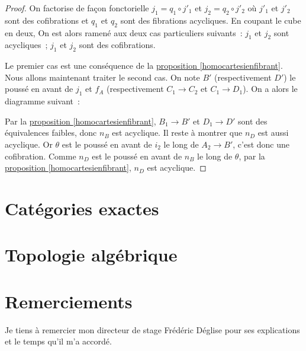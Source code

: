 \documentclass{amsart}
\newcommand{\sref}[2]{\hyperref[#2]{#1 \ref*{#2}}}
\theoremstyle{plain}
\theoremstyle{definition}
\theoremstyle{remark}
\newcommand{\ra}{\rightarrow}
\begin{document}
\begin{proof}
  On factorise de façon fonctorielle $j_1=q_1\circ j'_1$ et $j_2=q_2\circ j'_2$ où $j'_1$ et $j'_2$ sont des cofibrations
  et $q_1$ et $q_2$ sont des fibrations acycliques. En coupant le cube en deux, On est alors ramené aux deux cas particuliers suivants~:
  $j_1$ et $j_2$ sont acycliques~;
  $j_1$ et $j_2$ sont des cofibrations.

  Le premier cas est une conséquence de la \sref{proposition}{homocartesienfibrant}. Nous allons maintenant traiter le second cas.
  On note $B'$ (respectivement $D'$) le poussé en avant de $j_1$ et $f_A$ (respectivement $C_1\ra C_2$ et $C_1\ra D_1$).
  On a alors le diagramme suivant~:
  \begin{center}
  \end{center}
  Par la \sref{proposition}{homocartesienfibrant}, $B_1\ra B'$ et $D_1\ra D'$ sont des équivalences faibles, donc $n_B$ est acyclique.
  Il reste à montrer que $n_D$ est aussi acyclique.
  Or $\theta$ est le poussé en avant de $i_2$ le long de $A_2\ra B'$, c'est donc une cofibration. Comme $n_D$ est le poussé en avant de $n_B$ le long
  de $\theta$, par la \sref{proposition}{homocartesienfibrant}, $n_D$ est acyclique.
\end{proof}


\section{Catégories exactes}

\section{Topologie algébrique}
\label{annexetopologie}

\section*{Remerciements} Je tiens à remercier mon directeur de stage Frédéric Déglise pour ses explications et le temps qu'il m'a accordé.
\nocite{*}




\end{document}
